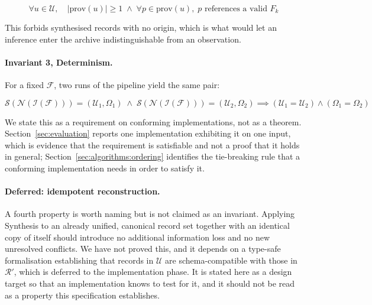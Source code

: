 \begin{equation}
  \forall u \in \mathcal{U}, \quad
  |\mathrm{prov}(u)| \ge 1
  \;\land\;
  \forall p \in \mathrm{prov}(u),\; p \text{ references a valid } F_k
  \label{eq:inv2}
\end{equation}

This forbids synthesised records with no origin, which is what would let an
inference enter the archive indistinguishable from an observation.

\paragraph{Invariant 3, Determinism.}
For a fixed $\mathcal{F}$, two runs of the pipeline yield the same pair:

\begin{equation}
  \mathcal{S}(\mathcal{N}(\mathcal{I}(\mathcal{F}))) = (\mathcal{U}_1, \Omega_1)
  \;\land\;
  \mathcal{S}(\mathcal{N}(\mathcal{I}(\mathcal{F}))) = (\mathcal{U}_2, \Omega_2)
  \implies
  (\mathcal{U}_1 = \mathcal{U}_2) \land (\Omega_1 = \Omega_2)
  \label{eq:inv3}
\end{equation}

We state this as a requirement on conforming implementations, not as a theorem.
Section~\ref{sec:evaluation} reports one implementation exhibiting it on one
input, which is evidence that the requirement is satisfiable and not a proof
that it holds in general; Section~\ref{sec:algorithms:ordering} identifies the
tie-breaking rule that a conforming implementation needs in order to satisfy it.

\paragraph{Deferred: idempotent reconstruction.}
A fourth property is worth naming but is not claimed as an invariant. Applying
Synthesis to an already unified, canonical record set together with an identical
copy of itself should introduce no additional information loss and no new
unresolved conflicts. We have not proved this, and it depends on a type-safe
formalisation establishing that records in $\mathcal{U}$ are schema-compatible
with those in $\mathcal{R}'$, which is deferred to the implementation phase. It is
stated here as a design target so that an implementation knows to test for it, and
it should not be read as a property this specification establishes.

